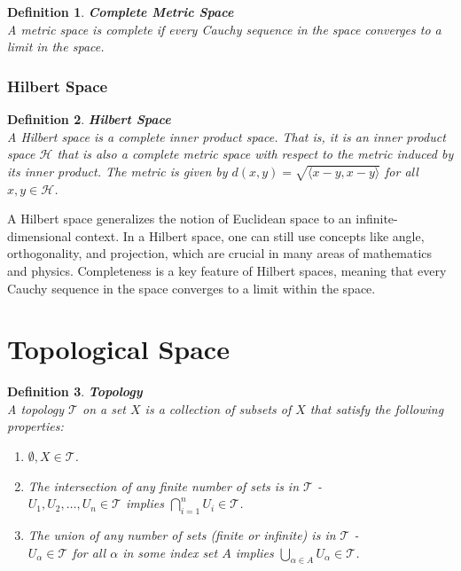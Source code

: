 \documentclass[11pt]{book} %
\newtheorem{definition}{Definition}[section]
\begin{document}
\begin{definition}{\textbf{Complete Metric Space}} \\
    A metric space is complete if every Cauchy sequence in the space converges to a limit in the space.
\end{definition}

\subsubsection{Hilbert Space}

\begin{definition}{\textbf{Hilbert Space}} \\
    A \emph{Hilbert space} is a complete inner product space. That is, it is an inner product space \( \mathcal{H} \) that 
    is also a complete metric space with respect to the metric induced by its inner product. 
    The metric is given by \( d(x,y) = \sqrt{\langle x-y, x-y \rangle} \) for all \( x, y \in \mathcal{H} \).
\end{definition}
    
A Hilbert space generalizes the notion of Euclidean space to an infinite-dimensional context. 
In a Hilbert space, one can still use concepts like angle, orthogonality, and projection, which are crucial in many areas of mathematics and physics. 
Completeness is a key feature of Hilbert spaces, meaning that every Cauchy sequence in the space converges to a limit within the space. 
    



\section{Topological Space}

\begin{definition}{\textbf{Topology}} \\
A topology \( \mathcal{T} \) on a set \( X \) is a collection of subsets of  \( X \) that satisfy the following properties:
\begin{enumerate}
    \item \( \emptyset, X \in \mathcal{T} \).
    \item The intersection of any finite number of sets is in \( \mathcal{T} \) - \\ 
    \( U_1, U_2, \ldots, U_n \in \mathcal{T} \) implies \( \bigcap_{i=1}^n U_i \in \mathcal{T} \).
    \item The union of any number of sets (finite or infinite) is in \( \mathcal{T} \) - \\
    \( U_\alpha \in \mathcal{T} \) for all \( \alpha \) in some index set \( A \) implies \( \bigcup_{\alpha \in A} U_\alpha \in \mathcal{T} \).
\end{enumerate}
\end{definition}
\end{document}
